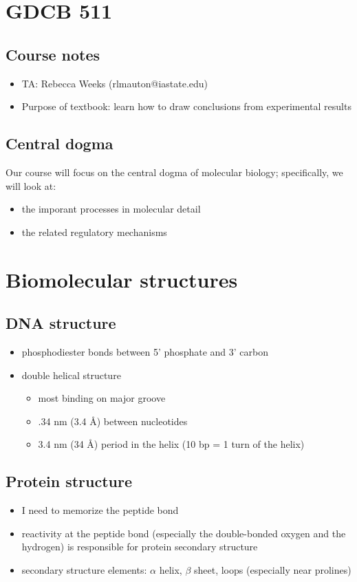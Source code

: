 \documentclass[10pt]{article}
\newenvironment{mitemize}
{
  \begin{itemize}
  \setlength{\itemsep}{1pt}
  \setlength{\parskip}{0pt}
  \setlength{\parsep}{0pt}}{\end{itemize}
}
\begin{document}
\section*{GDCB 511}
\subsection*{Course notes}
\begin{mitemize}
  \item TA: Rebecca Weeks (rlmauton@iastate.edu)
  \item Purpose of textbook: learn how to draw conclusions from experimental results
\end{mitemize}

\subsection*{Central dogma}
Our course will focus on the central dogma of molecular biology; specifically, we will look at:
\begin{mitemize}
  \item the imporant processes in molecular detail
  \item the related regulatory mechanisms
\end{mitemize}


\section*{Biomolecular structures}
\subsection*{DNA structure}
\begin{mitemize}
  \item phosphodiester bonds between 5' phosphate and 3' carbon
  \item double helical structure
  \begin{mitemize}
    \item most binding on major groove
    \item .34 nm (3.4 \AA) between nucleotides
    \item 3.4 nm (34 \AA) period in the helix (10 bp = 1 turn of the helix)
  \end{mitemize}
\end{mitemize}

\subsection*{Protein structure}
\begin{mitemize}
  \item I need to memorize the peptide bond
  \item reactivity at the peptide bond (especially the double-bonded oxygen and the hydrogen) is responsible for protein secondary structure
  \item secondary structure elements: $\alpha$ helix, $\beta$ sheet, loops (especially near prolines)
\end{mitemize}
\end{document}
